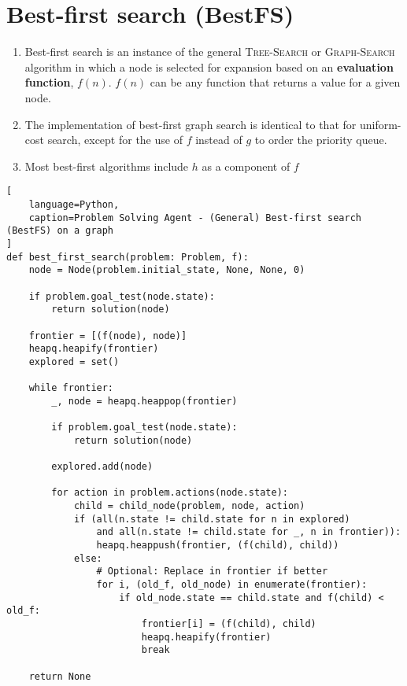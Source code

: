\section{Best-first search (BestFS) \cite{ai/book/Artificial-Intelligence-A-Modern-Approach/Russell-Norvig}}
\label{AI: Algorithms/Best-first search (BestFS)}


\begin{enumerate}
    \item Best-first search is an instance of the general \textsc{Tree-Search} or \textsc{Graph-Search} algorithm in which a node is selected for expansion based on an \textbf{evaluation function}, $f(n)$. $f(n)$ can be any function that returns a value for a given node.
    \hfill \cite{ai/book/Artificial-Intelligence-A-Modern-Approach/Russell-Norvig}

    \item The implementation of best-first graph search is identical to that for uniform-cost search, except for the use of $f$ instead of $g$ to order the priority queue.
    \hfill \cite{ai/book/Artificial-Intelligence-A-Modern-Approach/Russell-Norvig}

    \item Most best-first algorithms include $h$ as a component of $f$
    \hfill \cite{ai/book/Artificial-Intelligence-A-Modern-Approach/Russell-Norvig}
\end{enumerate}


\begin{lstlisting}[
    language=Python,
    caption=Problem Solving Agent - (General) Best-first search (BestFS) on a graph
]
def best_first_search(problem: Problem, f):
    node = Node(problem.initial_state, None, None, 0)

    if problem.goal_test(node.state):
        return solution(node)

    frontier = [(f(node), node)]
    heapq.heapify(frontier)
    explored = set()

    while frontier:
        _, node = heapq.heappop(frontier)

        if problem.goal_test(node.state):
            return solution(node)

        explored.add(node)

        for action in problem.actions(node.state):
            child = child_node(problem, node, action)
            if (all(n.state != child.state for n in explored)
                and all(n.state != child.state for _, n in frontier)):
                heapq.heappush(frontier, (f(child), child))
            else:
                # Optional: Replace in frontier if better
                for i, (old_f, old_node) in enumerate(frontier):
                    if old_node.state == child.state and f(child) < old_f:
                        frontier[i] = (f(child), child)
                        heapq.heapify(frontier)
                        break

    return None
\end{lstlisting}




